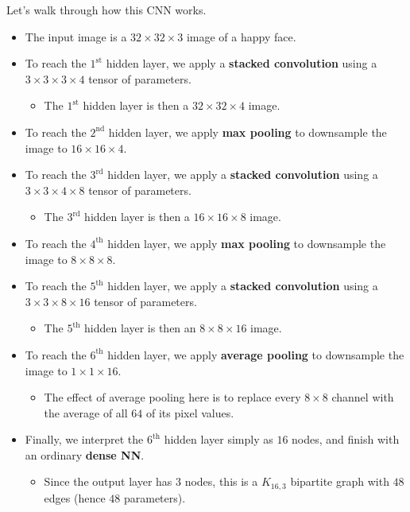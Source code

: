 Let's walk through how this CNN works.
\begin{itemize}
    \item The input image is a $32 \times 32 \times 3$ image
    of a happy face.
    \item To reach the $1^{\mathrm{st}}$ hidden layer,
    we apply a \textbf{stacked convolution} using a
    $3 \times 3 \times 3 \times 4$ tensor of parameters.
    \begin{itemize}
        \item The $1^{\mathrm{st}}$ hidden layer is then
        a $32 \times 32 \times 4$ image.
    \end{itemize}
    \item To reach the $2^{\mathrm{nd}}$ hidden layer,
    we apply \textbf{max pooling} to downsample the image
    to $16 \times 16 \times 4$.
    \item To reach the $3^{\mathrm{rd}}$ hidden layer,
    we apply a \textbf{stacked convolution} using a
    $3 \times 3 \times 4 \times 8$ tensor of parameters.
    \begin{itemize}
        \item The $3^{\mathrm{rd}}$ hidden layer is then
        a $16 \times 16 \times 8$ image.
    \end{itemize}
    \item To reach the $4^{\mathrm{th}}$ hidden layer,
    we apply \textbf{max pooling} to downsample the image
    to $8 \times 8 \times 8$.
    \item To reach the $5^{\mathrm{th}}$ hidden layer,
    we apply a \textbf{stacked convolution} using a
    $3 \times 3 \times 8 \times 16$ tensor of parameters.
    \begin{itemize}
        \item The $5^{\mathrm{th}}$ hidden layer is then
        an $8 \times 8 \times 16$ image.
    \end{itemize}
    \item To reach the $6^{\mathrm{th}}$ hidden layer,
    we apply \textbf{average pooling} to downsample the image
    to $1 \times 1 \times 16$.
    \begin{itemize}
        \item The effect of average pooling here
        is to replace every $8 \times 8$ channel
        with the average of all $64$ of its pixel values.
    \end{itemize}
    \item Finally, we interpret the $6^{\mathrm{th}}$ hidden layer
    simply as $16$ nodes, and finish with
    an ordinary \textbf{dense NN}.
    \begin{itemize}
        \item Since the output layer has $3$ nodes,
        this is a $K_{16, 3}$ bipartite graph
        with $48$ edges (hence $48$ parameters).
    \end{itemize}
\end{itemize}


